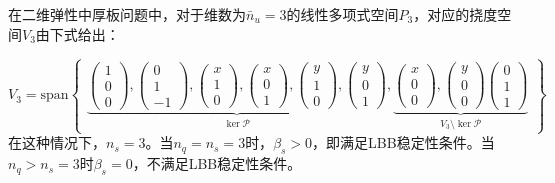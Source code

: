 在二维弹性中厚板问题中，对于维数为$\bar{n}_u=3$的线性多项式空间$P_3$，对应的挠度空间$V_3$由下式给出：

\begin{equation}\label{ch_5:eq:base}
    V_3 = \mathrm{span} 
    \begin{Bmatrix}
        \underbrace{
        \begin{pmatrix} 1 \\ 0 \\ 0 \end{pmatrix},
        \begin{pmatrix} 0 \\ 1 \\-1 \end{pmatrix},
        \begin{pmatrix} x \\ 1 \\ 0 \end{pmatrix},
        \begin{pmatrix} x \\ 0 \\ 1 \end{pmatrix},
        \begin{pmatrix} y \\ 1 \\ 0 \end{pmatrix},
        \begin{pmatrix} y \\ 0 \\ 1 \end{pmatrix}
        }_{\ker \mathcal P},
        \underbrace{
        \begin{pmatrix} x \\ 0 \\ 0 \end{pmatrix},
        \begin{pmatrix} y \\ 0 \\ 0 \end{pmatrix}
        \begin{pmatrix} 0 \\ 1 \\ 1 \end{pmatrix}
        }_{V_3\setminus \ker \mathcal P}
    \end{Bmatrix}
\end{equation}
在这种情况下，$n_s=3$。当$n_q=n_s=3$时，$\beta_s>0$，即满足LBB稳定性条件。当$n_q>n_s=3$时$\beta_s=0$，不满足LBB稳定性条件。


